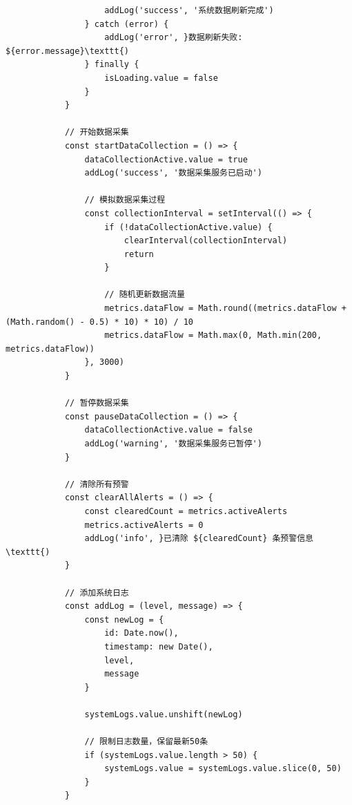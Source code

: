 {{\begin{verbatim}
                    addLog('success', '系统数据刷新完成')
                } catch (error) {
                    addLog('error', }数据刷新失败: ${error.message}\texttt{)
                } finally {
                    isLoading.value = false
                }
            }
            
            // 开始数据采集
            const startDataCollection = () => {
                dataCollectionActive.value = true
                addLog('success', '数据采集服务已启动')
                
                // 模拟数据采集过程
                const collectionInterval = setInterval(() => {
                    if (!dataCollectionActive.value) {
                        clearInterval(collectionInterval)
                        return
                    }
                    
                    // 随机更新数据流量
                    metrics.dataFlow = Math.round((metrics.dataFlow + (Math.random() - 0.5) * 10) * 10) / 10
                    metrics.dataFlow = Math.max(0, Math.min(200, metrics.dataFlow))
                }, 3000)
            }
            
            // 暂停数据采集
            const pauseDataCollection = () => {
                dataCollectionActive.value = false
                addLog('warning', '数据采集服务已暂停')
            }
            
            // 清除所有预警
            const clearAllAlerts = () => {
                const clearedCount = metrics.activeAlerts
                metrics.activeAlerts = 0
                addLog('info', }已清除 ${clearedCount} 条预警信息\texttt{)
            }
            
            // 添加系统日志
            const addLog = (level, message) => {
                const newLog = {
                    id: Date.now(),
                    timestamp: new Date(),
                    level,
                    message
                }
                
                systemLogs.value.unshift(newLog)
                
                // 限制日志数量，保留最新50条
                if (systemLogs.value.length > 50) {
                    systemLogs.value = systemLogs.value.slice(0, 50)
                }
            }
            

\end{verbatim}}}
